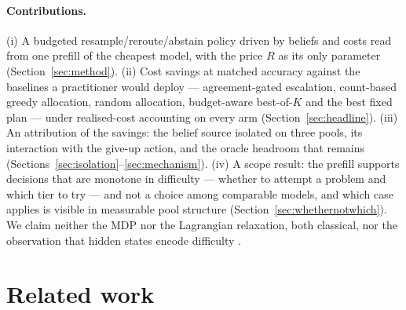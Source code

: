 \documentclass[10pt]{article} %
\begin{document}
\paragraph{Contributions.}
(i) A budgeted resample/reroute/abstain policy driven by beliefs and costs read from one prefill
of the cheapest model, with the price $R$ as its only parameter (Section~\ref{sec:method}).
(ii) Cost savings at matched accuracy against the baselines a practitioner would deploy ---
agreement-gated escalation, count-based greedy allocation, random allocation, budget-aware
best-of-$K$ and the best fixed plan --- under realised-cost accounting on every arm
(Section~\ref{sec:headline}).  (iii) An attribution of the savings: the belief source isolated on
three pools, its interaction with the give-up action, and the oracle headroom that remains
(Sections~\ref{sec:isolation}--\ref{sec:mechanism}).  (iv) A scope result: the prefill supports
decisions that are monotone in difficulty --- whether to attempt a problem and which tier to try
--- and not a choice among comparable models, and which case applies is visible in measurable
pool structure (Section~\ref{sec:whethernotwhich}).  We claim neither the
MDP nor the Lagrangian relaxation, both classical, nor the observation that hidden states encode
difficulty \citep{llmalreadyknows2025,encodefailures2026,prefillrouter2026}.

\section{Related work}
\label{sec:related}
\end{document}
